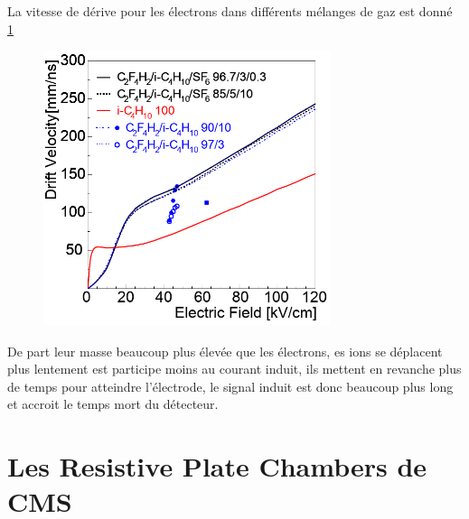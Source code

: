 La vitesse de dérive pour les électrons dans différents mélanges de gaz est donné \ref{drift} \cite{Riegler:570462}
\begin{figure}[h!]
	\centering
	\includegraphics[width=0.75\textwidth]{RPC/drift.png}
	\label{drift}
\end{figure}

De part leur masse beaucoup plus élevée que les électrons, es ions se déplacent plus lentement est participe moins au courant induit, ils mettent en revanche plus de temps pour atteindre l'électrode, le signal induit est donc beaucoup plus long et accroit le temps mort du détecteur.

\section{Les Resistive Plate Chambers de CMS}
